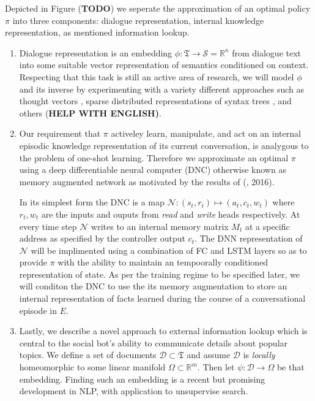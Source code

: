 \documentclass{article} %
\theoremstyle{named}
\def\scriptd{{\mathcal D}}
\def\scriptn{{\mathcal N}}
\def\scripts{{\mathcal S}}
\begin{document}
Depicted in Figure (\textbf{TODO}) we seperate the approximation of an optimal policy $\pi$ into three components: dialogue representation, internal knowledge representation, as mentioned information lookup.
\begin{enumerate}
\item Dialogue representation is an embedding $\phi: \mathfrak{T} \to \scripts = \mathbb{R}^n$ from dialogue text into some suitable vector representation of semantics conditioned on context. Respecting that this task is still an active area of research, we will model $\phi$ and its inverse by experimenting with a variety different approaches such as thought vectors \cite{NIPS2015_5950}, sparse distributed representations of syntax trees \cite{DBLP:journals/corr/YogatamaFDS14}, and others (\textbf{HELP WITH ENGLISH)}.

\item Our requirement that $\pi$ activeley learn, manipulate, and act on an internal episodic knowledge representation of its current conversation, is analygous to the problem of one-shot learning. Therefore we approximate an optimal $\pi$ using a deep differentiable neural computer (DNC)\cite{graves2016hybrid}\cite{DBLP:journals/corr/GravesWD14} otherwise known as memory augmented network as motivated by the results of (\citeauthor{DBLP:journals/corr/SantoroBBWL16}, 2016).

In its simplest form the DNC is a map $\scriptn: (s_t, r_t) \mapsto (a_t, c_t, w_t)$ where  $r_t, w_t$ are the inputs and ouputs from \emph{read} and \emph{write} heads respectively. At every time step $\scriptn$ writes to an internal memory matrix $M_t$ at a specific address as specified by the controller output $c_t$. The DNN representation of $\scriptn$ will be implimented using a combination of FC and LSTM layers so as to provide $\pi$ with the ability to maintain an tempoorally conditioned representation of state. As per the training regime to be specified later, we will conditon the DNC to use the its memory augmentation to store an internal representation of facts learned during the course of a conversational episode in $E$.


\item Lastly, we describe a novel approach to external information lookup which is central to the social bot's ability to communicate details about popular topics. We define a set of documents $\scriptd \subset \mathfrak{T}$ and assume $\scriptd$ is \emph{locally} homeomorphic to some linear manifold $\Omega \subset \mathbb{R}^m$. Then let $\psi: \scriptd \to \Omega$ be that embedding. Finding such an embedding is a recent but promising development in NLP, with application to unsupervise search\cite{DBLP:journals/corr/DaiOL15}.


\end{enumerate}
\end{document}
